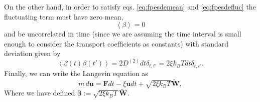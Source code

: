 \documentclass[ twoside,openright,titlepage,numbers=noenddot,%
headinclude,footinclude,cleardoublepage=empty,abstract=on,
BCOR=5mm,paper=a4,fontsize=11pt, dvipsnames
]{scrreprt}
\renewcommand{\vec}[1]{\bm{#1}}
\newcommand{\kT}{k_B T}
\newcommand{\noise}{\widetilde{W}}
\newcommand{\pvel}{u}
\begin{document}
On the other hand, in order to satisfy eqs. \eqref{eq:fpesdemean} and \eqref{eq:fpesdefluc} the fluctuating term must have zero mean,
\begin{equation}
  \label{eq:noisemean}
  \left\langle\beta\right\rangle = 0
\end{equation}
and be uncorrelated in time (since we are assuming the time interval is small enough to consider the transport coefficients as constants) with standard deviation given by
\begin{equation}
  \label{eq:noiseautocorr}
  \left\langle\beta(t)\beta(t')\right\rangle = 2D^{(2)}dt\delta_{t,t'} = 2\xi\kT dt\delta_{t,t'}.
\end{equation}
Finally, we can write the Langevin equation as
\begin{equation}
  \label{eq:langevinfull}
  m\, d\vec{\pvel} = \vec{F}dt - \xi\vec{\pvel}dt +  \sqrt{2\xi\kT}\vec{\noise},
\end{equation}
Where we have defined $\vec{\beta} := \sqrt{2\xi\kT}\vec{\noise}$.
\end{document}
